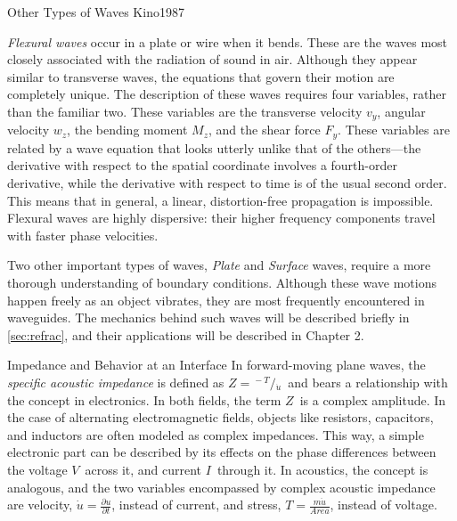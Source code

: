 \documentclass[a4paper,10pt]{report}
\numberwithin{equation}{section}
\begin{document}
{\begin{chapter}
\begin{section}{Other Types of Waves}
{Kino1987}
\par
\emph{Flexural waves} occur in a plate or wire when it bends. These are the waves most closely associated with the radiation of sound in air. Although they appear similar to transverse waves, the equations that govern their motion are completely unique. The description of these waves requires four variables, rather than the familiar two. These variables are the transverse velocity $v_y$, angular velocity $w_z$, the bending moment $M_z$, and the shear force $F_y$. These variables are related by a wave equation that looks utterly unlike that of the others---the derivative with respect to the spatial coordinate involves a fourth-order derivative, while the derivative with respect to time is of the usual second order. This means that in general, a linear, distortion-free propagation is impossible. Flexural waves are highly dispersive: their higher frequency components travel with faster phase velocities. \cite[p.~95]{Cremer1973}
\par
Two other important types of waves, \emph{Plate} and \emph{Surface} waves, require a more thorough understanding of boundary conditions. Although these wave motions happen freely as an object vibrates, they are most frequently encountered in waveguides. The mechanics behind such waves will be described briefly in \ref{sec:refrac}, and their applications will be described in Chapter 2.
\par
\end{section}
\par
\begin{section}{Impedance and Behavior at an Interface}
In forward-moving plane waves, the \emph{specific acoustic impedance} is defined as $Z = {}^{{}{}-T}/{}_{\dot{u}}$\  and bears a relationship with the concept in electronics. In both fields, the term $Z$\  is a complex amplitude. In the case of alternating electromagnetic fields, objects like resistors, capacitors, and inductors are often modeled as complex impedances. This way, a simple electronic part can be described by its effects on the phase differences between the voltage $V$\  across it, and current $I$\  through it.\cite[p.~168]{scherz07} In acoustics, the concept is analogous, and the two variables encompassed by complex acoustic impedance are velocity, $\dot{u} = \frac{\partial u}{\partial t}$, instead of current, and stress, $T = \frac{m\ddot{u}}{Area}$, instead of voltage.\cite[p.~9]{Cremer1973} \footnotemark 
\par

\end{section}
\end{chapter}}
\end{document}
